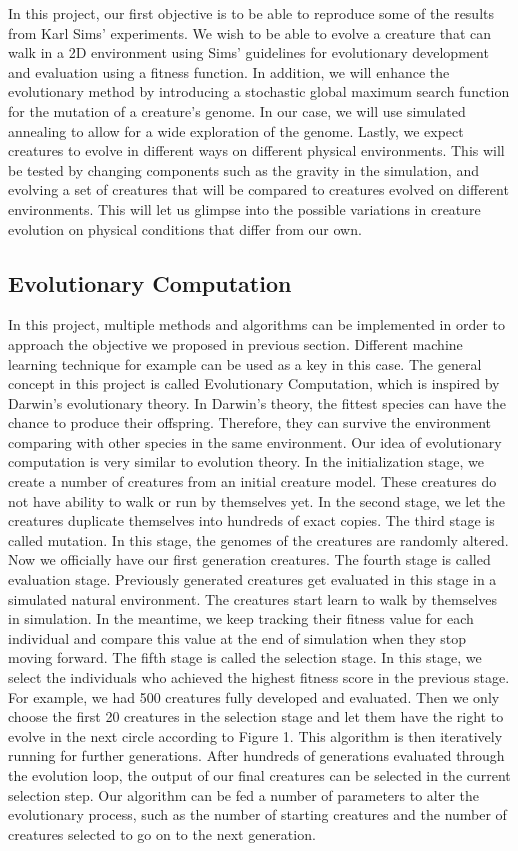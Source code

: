 \documentclass[letterpaper, 10 pt, conference]{ieeeconf}  %
\begin{document}
In this project, our first objective is to be able to reproduce some of the results from Karl Sims' experiments. We wish to be able to evolve a creature that can walk in a 2D environment using Sims' guidelines for evolutionary development and evaluation using a fitness function. In addition, we will enhance the evolutionary method by introducing a stochastic global maximum search function for the mutation of a creature's genome. In our case, we will use simulated annealing to allow for a wide exploration of the genome. Lastly, we expect creatures to evolve in different ways on different physical environments. This will be tested by changing components such as the gravity in the simulation, and evolving a set of creatures that will be compared to creatures evolved on different environments. This will let us glimpse into the possible variations in creature evolution on physical conditions that differ from our own.

\subsection{Evolutionary Computation} In this project, multiple methods and algorithms can be implemented in order to approach the objective we proposed in previous section. Different machine learning technique for example can be used as a key in this case. The general concept in this project is called Evolutionary Computation, which is inspired by Darwin's evolutionary theory. In Darwin's theory, the fittest species can have the chance to produce their offspring. Therefore, they can survive the environment comparing with other species in the same environment. Our idea of evolutionary computation is very similar to evolution theory. In the initialization stage, we create a number of creatures from an initial creature model. These creatures do not have ability to walk or run by themselves yet. In the second stage, we let the creatures duplicate themselves into hundreds of exact copies. The third stage is called mutation. In this stage, the genomes of the creatures are randomly altered. Now we officially have our first generation creatures. The fourth stage is called evaluation stage. Previously generated creatures get evaluated in this stage in a simulated natural environment. The creatures start learn to walk by themselves in simulation. In the meantime, we keep tracking their fitness value for each individual and compare this value at the end of simulation when they stop moving forward. The fifth stage is called the selection stage. In this stage, we select the individuals who achieved the highest fitness score in the previous stage. For example, we had 500 creatures fully developed and evaluated. Then we only choose the first 20 creatures in the selection stage and let them have the right to evolve in the next circle according to Figure 1. This algorithm is then iteratively running for further generations. After hundreds of generations evaluated through the evolution loop, the output of our final creatures can be selected in the current selection step. Our algorithm can be fed a number of parameters to alter the evolutionary process, such as the number of starting creatures and the number of creatures selected to go on to the next generation.
\end{document}
